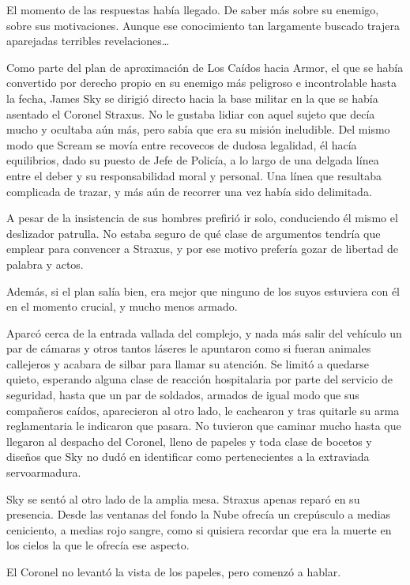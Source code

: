 \noindent
El momento de las respuestas había llegado. De saber más sobre su enemigo, sobre sus motivaciones. Aunque ese conocimiento tan largamente buscado trajera aparejadas terribles revelaciones\dots

\parbreak\noindent
Como parte del plan de aproximación de Los Caídos hacia Armor, el que se había convertido por derecho propio en su enemigo más peligroso e incontrolable hasta la fecha, James Sky se dirigió directo hacia la base militar en la que se había asentado el Coronel Straxus. No le gustaba lidiar con aquel sujeto que decía mucho y ocultaba aún más, pero sabía que era su misión ineludible. Del mismo modo que Scream se movía entre recovecos de dudosa legalidad, él hacía equilibrios, dado su puesto de Jefe de Policía, a lo largo de una delgada línea entre el deber y su responsabilidad moral y personal. Una línea que resultaba complicada de trazar, y más aún de recorrer una vez había sido delimitada.

A pesar de la insistencia de sus hombres prefirió ir solo, conduciendo él mismo el deslizador patrulla. No estaba seguro de qué clase de argumentos tendría que emplear para convencer a Straxus, y por ese motivo prefería gozar de libertad de palabra y actos.

Además, si el plan salía bien, era mejor que ninguno de los suyos estuviera con él en el momento crucial, y mucho menos armado.

Aparcó cerca de la entrada vallada del complejo, y nada más salir del vehículo un par de cámaras y otros tantos láseres le apuntaron como si fueran animales callejeros y acabara de silbar para llamar su atención. Se limitó a quedarse quieto, esperando alguna clase de reacción hospitalaria por parte del servicio de seguridad, hasta que un par de soldados, armados de igual modo que sus compañeros caídos, aparecieron al otro lado, le cachearon y tras quitarle su arma reglamentaria le indicaron que pasara. No tuvieron que caminar mucho hasta que llegaron al despacho del Coronel, lleno de papeles y toda clase de bocetos y diseños que Sky no dudó en identificar como pertenecientes a la extraviada servoarmadura.

Sky se sentó al otro lado de la amplia mesa. Straxus apenas reparó en su presencia. Desde las ventanas del fondo la Nube ofrecía un crepúsculo a medias ceniciento, a medias rojo sangre, como si quisiera recordar que era la muerte en los cielos la que le ofrecía ese aspecto.

El Coronel no levantó la vista de los papeles, pero comenzó a hablar.


